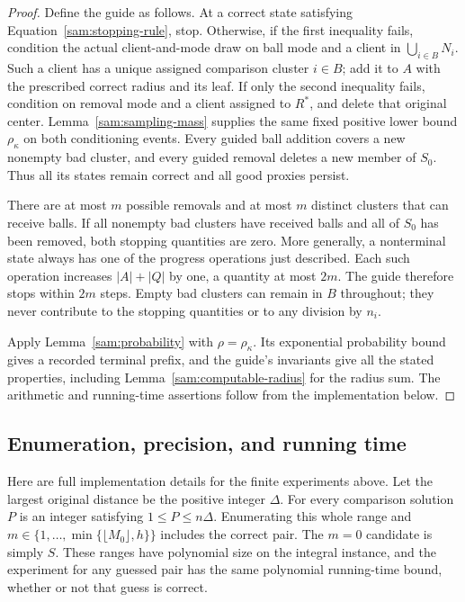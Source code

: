 \begin{proof}
Define the guide as follows.  At a correct state satisfying
Equation~\eqref{sam:stopping-rule}, stop.  Otherwise, if the first
inequality fails, condition the actual client-and-mode draw on ball mode
and a client in $\bigcup_{i\in B}N_i$.  Such a client has a unique
assigned comparison cluster $i\in B$; add it to $A$ with the prescribed
correct radius and its leaf.  If only the second inequality fails,
condition on removal mode and a client assigned to $R^*$, and delete
that original center.  Lemma~\ref{sam:sampling-mass} supplies the same
fixed positive lower bound $\rho_\kappa$ on both conditioning events.
Every guided ball addition covers a new nonempty bad cluster, and every
guided removal deletes a new member of $S_0$.  Thus all its states remain
correct and all good proxies persist.

There are at most $m$ possible removals and at most $m$ distinct clusters
that can receive balls.  If all nonempty bad clusters have received balls
and all of $S_0$ has been removed, both stopping quantities are zero.
More generally, a nonterminal state always has one of the progress
operations just described.  Each such operation increases $|A|+|Q|$ by
one, a quantity at most $2m$.  The guide therefore stops within $2m$
steps.  Empty bad clusters can remain in $B$ throughout; they never
contribute to the stopping quantities or to any division by $n_i$.

Apply Lemma~\ref{sam:probability} with $\rho=\rho_\kappa$.  Its
exponential probability bound gives a recorded terminal prefix, and
the guide's invariants give all the stated properties, including
Lemma~\ref{sam:computable-radius} for the radius sum.  The arithmetic and
running-time assertions follow from the implementation below.
\end{proof}

\subsection{Enumeration, precision, and running time}

Here are full implementation details for the finite experiments above.
Let the largest original distance be the positive integer $\Delta$.
For every comparison solution $P$ is an integer satisfying
$1\le P\le n\Delta$.  Enumerating this whole range and
$m\in\{1,\ldots,\min\{\lfloor M_0\rfloor,h\}\}$ includes the
correct pair.  The $m=0$ candidate is simply $S$.  These ranges have
polynomial size on the integral instance, and the experiment for any
guessed pair has the same polynomial running-time bound, whether or not
that guess is correct.

